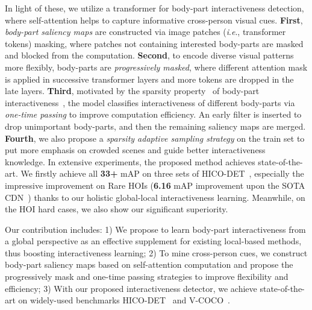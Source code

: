 \documentclass[runningheads]{llncs}
\newcommand{\ie}{\textit{i}.\textit{e}.}
\begin{document}
In light of these, we utilize a transformer for body-part interactiveness detection, where self-attention helps to capture informative cross-person visual cues.
\textbf{First}, \textit{body-part saliency maps} are constructed via image patches (\ie, transformer tokens) masking, where patches not containing interested body-parts are masked and blocked from the  computation. 
\textbf{Second}, to encode diverse visual patterns more flexibly, body-parts are \textit{progressively masked}, where different attention mask is applied in successive transformer layers and more tokens are dropped in the late layers. 
\textbf{Third}, motivated by the sparsity property~\cite{hake,li2021transferable} of body-part interactiveness~\cite{li2021transferable}, the model classifies interactiveness of different body-parts via \textit{one-time passing} to improve computation efficiency. An early filter is inserted to drop unimportant body-parts, and then the remaining saliency maps are merged.
\textbf{Fourth}, 
we also propose a \textit{sparsity adaptive sampling strategy} on the train set to put more emphasis on crowded scenes and guide better interactiveness knowledge.
In extensive experiments, the proposed method achieves state-of-the-art.
We firstly achieve all \textbf{33+} mAP on three sets of HICO-DET~\cite{hicodet}, especially the impressive improvement on Rare HOIs (\textbf{6.16} mAP improvement upon the SOTA CDN~\cite{cdn}) thanks to our holistic global-local interactiveness learning. 
Meanwhile, on the HOI hard cases, we also show our significant superiority.

Our contribution includes: 
1) We propose to learn body-part interactiveness from a global perspective as an effective supplement for existing local-based methods, thus boosting interactiveness learning; 
2) To mine cross-person cues,
we construct body-part saliency maps based on self-attention computation and propose the progressively mask and one-time passing strategies to 
improve flexibility and efficiency;
3) With our proposed interactiveness detector, we achieve state-of-the-art on widely-used benchmarks HICO-DET~\cite{hicodet} and V-COCO~\cite{vcoco}.
\end{document}
